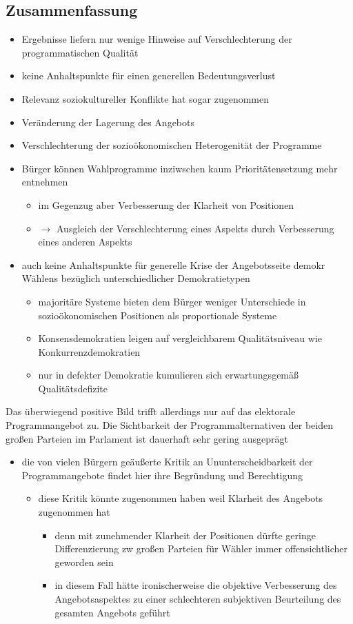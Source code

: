 \documentclass[11pt]{article}
\begin{document}
\subsection{Zusammenfassung}
\label{sec:orga7cfe62}
\begin{itemize}
\item Ergebnisse liefern nur wenige Hinweise auf Verschlechterung der programmatischen Qualität
\item keine Anhaltspunkte für einen generellen Bedeutungsverlust
\item Relevanz soziokultureller Konflikte hat sogar zugenommen
\item Veränderung der Lagerung des Angebots
\item Verschlechterung der sozioökonomischen Heterogenität der Programme
\item Bürger können Wahlprogramme inziwschen kaum Prioritätensetzung mehr entnehmen
\begin{itemize}
\item im Gegenzug aber Verbesserung der Klarheit von Positionen
\item \(\rightarrow\) Ausgleich der Verschlechterung eines Aspekts durch Verbesserung eines anderen Aspekts
\end{itemize}
\item auch keine Anhaltspunkte für generelle Krise der Angebotsseite demokr Wählens bezüglich unterschiedlicher Demokratietypen
\begin{itemize}
\item majoritäre Systeme bieten dem Bürger weniger Unterschiede in sozioökonomischen Positionen als proportionale Systeme
\item Konsensdemokratien leigen auf vergleichbarem Qualitätsniveau wie Konkurrenzdemokratien
\item nur in defekter Demokratie kumulieren sich erwartungsgemäß Qualitätsdefizite
\end{itemize}
\end{itemize}

Das überwiegend positive Bild trifft allerdings nur auf das elektorale Programmangebot zu. Die Sichtbarkeit der Programmalternativen der beiden großen Parteien im Parlament ist dauerhaft sehr gering ausgeprägt
\begin{itemize}
\item die von vielen Bürgern geäußerte Kritik an Ununterscheidbarkeit der Programmangebote findet hier ihre Begründung und Berechtigung
\begin{itemize}
\item diese Kritik könnte zugenommen haben weil Klarheit des Angebots zugenommen hat
\begin{itemize}
\item denn mit zunehmender Klarheit der Positionen dürfte geringe Differenzierung zw großen Parteien für Wähler immer offensichtlicher geworden sein
\item in diesem Fall hätte ironischerweise die objektive Verbesserung des Angebotsaspektes zu einer schlechteren subjektiven Beurteilung des gesamten Angebots geführt
\end{itemize}
\end{itemize}
\end{itemize}
\end{document}
